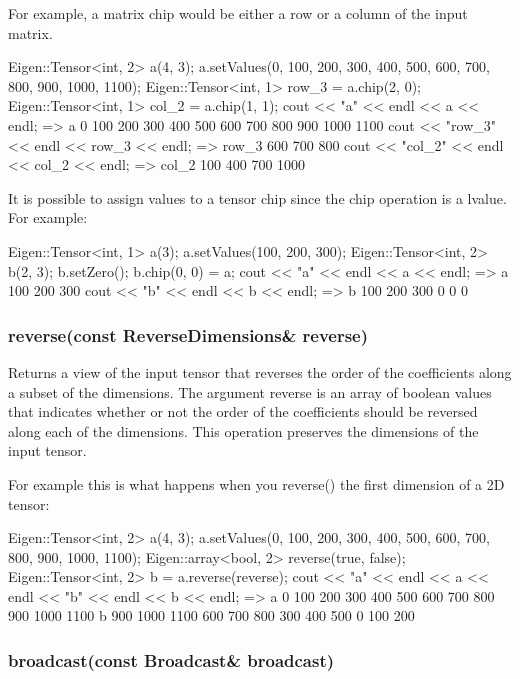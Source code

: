 For example, a matrix chip would be either a row or a column of the input matrix. \begin{DoxyVerb}Eigen::Tensor<int, 2> a(4, 3);
a.setValues({{0, 100, 200}, {300, 400, 500},
             {600, 700, 800}, {900, 1000, 1100}});
Eigen::Tensor<int, 1> row_3 = a.chip(2, 0);
Eigen::Tensor<int, 1> col_2 = a.chip(1, 1);
cout << "a" << endl << a << endl;
=>
a
   0   100   200
 300   400   500
 600   700   800
 900  1000  1100
cout << "row_3" << endl << row_3 << endl;
=>
row_3
   600   700   800
cout << "col_2" << endl << col_2 << endl;
=>
col_2
   100   400   700    1000
\end{DoxyVerb}


It is possible to assign values to a tensor chip since the chip operation is a lvalue. For example\+: \begin{DoxyVerb}Eigen::Tensor<int, 1> a(3);
a.setValues({{100, 200, 300}});
Eigen::Tensor<int, 2> b(2, 3);
b.setZero();
b.chip(0, 0) = a;
cout << "a" << endl << a << endl;
=>
a
 100
 200
 300
cout << "b" << endl << b << endl;
=>
b
   100   200   300
     0     0     0
\end{DoxyVerb}


\subsubsection*{reverse(const Reverse\+Dimensions\& reverse)}

Returns a view of the input tensor that reverses the order of the coefficients along a subset of the dimensions. The argument reverse is an array of boolean values that indicates whether or not the order of the coefficients should be reversed along each of the dimensions. This operation preserves the dimensions of the input tensor.

For example this is what happens when you {\ttfamily reverse()} the first dimension of a 2D tensor\+: \begin{DoxyVerb}Eigen::Tensor<int, 2> a(4, 3);
a.setValues({{0, 100, 200}, {300, 400, 500},
            {600, 700, 800}, {900, 1000, 1100}});
Eigen::array<bool, 2> reverse({true, false});
Eigen::Tensor<int, 2> b = a.reverse(reverse);
cout << "a" << endl << a << endl << "b" << endl << b << endl;
=>
a
   0   100   200
 300   400   500
 600   700   800
 900  1000  1100
b
 900  1000  1100
 600   700   800
 300   400   500
   0   100   200
\end{DoxyVerb}


\subsubsection*{broadcast(const Broadcast\& broadcast)}


